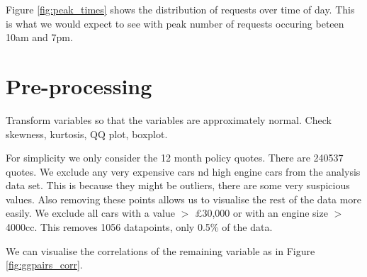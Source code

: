 Figure \ref{fig:peak_times} shows the distribution of requests over time of day. This  is what we would expect to see with peak number of requests occuring beteen 10am and 7pm.


\section{Pre-processing}
Transform variables so that the variables are approximately normal. Check skewness, kurtosis, QQ plot, boxplot.

For simplicity we only consider the 12 month policy quotes. There are 240537 quotes. 
We exclude any very expensive cars nd high engine cars from the analysis data set. This is because they might be outliers, there are some very suspicious values. Also removing these points allows us to visualise the rest of the data more easily. 
We exclude all cars with a value $>$ \pounds30,000 or with an engine size $>$ 4000cc. This removes 1056 datapoints, only 0.5\% of the data. 

We can visualise the correlations of the remaining variable as in Figure \ref{fig:ggpairs_corr}.


